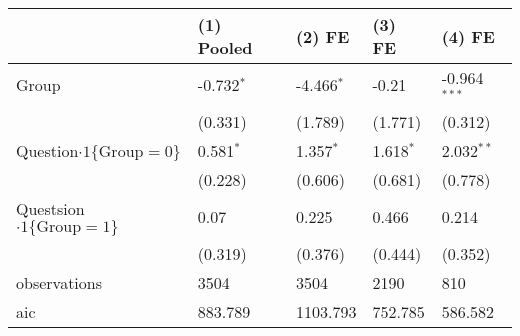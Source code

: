 \begin{tabular}{lllll}
\hline
 & (1) Pooled & (2) FE & (3) FE & (4) FE \\
\hline
Group & -0.732$^{*}$ & -4.466$^{*}$ & -0.21 & -0.964$^{***}$ \\
 & (0.331) & (1.789) & (1.771) & (0.312) \\
Question$\cdot1\{\text{Group}=0\}$ & 0.581$^{*}$ & 1.357$^{*}$ & 1.618$^{*}$ & 2.032$^{**}$ \\
 & (0.228) & (0.606) & (0.681) & (0.778) \\
Questsion$\cdot1\{\text{Group}=1\}$ & 0.07 & 0.225 & 0.466 & 0.214 \\
 & (0.319) & (0.376) & (0.444) & (0.352) \\\hline

observations & 3504 & 3504 & 2190 & 810 \\
aic & 883.789 & 1103.793 & 752.785 & 586.582 \\
\hline
\end{tabular}
